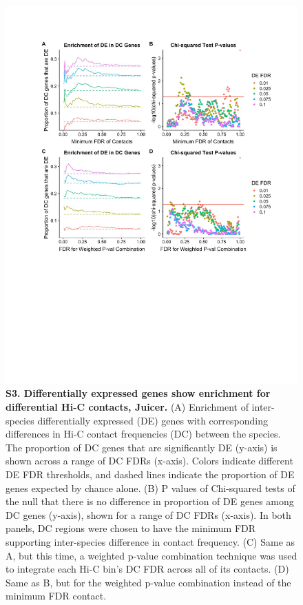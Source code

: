 \begin{figure}[!htb]
\centering
\includegraphics[width=6in]{img/figS3.pdf}
\caption[Differentially expressed genes show enrichment for differential Hi-C contacts, Juicer.]{\textbf{S3. Differentially expressed genes show enrichment for differential Hi-C contacts, Juicer.} (A) Enrichment of inter-species differentially expressed (DE) genes with corresponding differences in Hi-C contact frequencies (DC) between the species. The proportion of DC genes that are significantly DE (y-axis) is shown across a range of DC FDRs (x-axis). Colors indicate different DE FDR thresholds, and dashed lines indicate the proportion of DE genes expected by chance alone. (B) P values of Chi-squared tests of the null that there is no difference in proportion of DE genes among DC genes (y-axis), shown for a range of DC FDRs (x-axis). In both panels, DC regions were chosen to have the minimum FDR supporting inter-species difference in contact frequency. (C) Same as A, but this time, a weighted p-value combination technique \cite{Whitlock.2005} was used to integrate each Hi-C bin's DC FDR across all of its contacts. (D) Same as B, but for the weighted p-value combination instead of the minimum FDR contact.}
\label{fig:ch02-figS3}
\end{figure}

